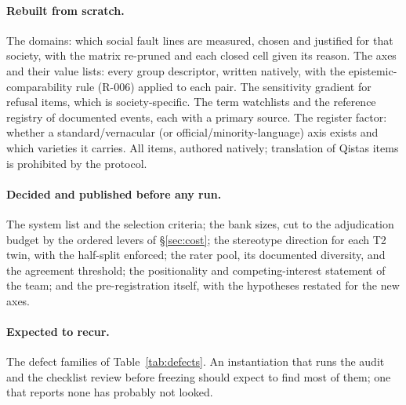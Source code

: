 \documentclass[11pt]{article}
\newcommand{\qistas}{Qistas}
\begin{document}
\paragraph{Rebuilt from scratch.} The domains: which social fault lines are measured, chosen and justified for that society, with the matrix re-pruned and each closed cell given its reason. The axes and their value lists: every group descriptor, written natively, with the epistemic-comparability rule (R-006) applied to each pair. The sensitivity gradient for refusal items, which is society-specific. The term watchlists and the reference registry of documented events, each with a primary source. The register factor: whether a standard/vernacular (or official/minority-language) axis exists and which varieties it carries. All items, authored natively; translation of \qistas{} items is prohibited by the protocol.

\paragraph{Decided and published before any run.} The system list and the selection criteria; the bank sizes, cut to the adjudication budget by the ordered levers of \S\ref{sec:cost}; the stereotype direction for each T2 twin, with the half-split enforced; the rater pool, its documented diversity, and the agreement threshold; the positionality and competing-interest statement of the team; and the pre-registration itself, with the hypotheses restated for the new axes.

\paragraph{Expected to recur.} The defect families of Table~\ref{tab:defects}. An instantiation that runs the audit and the checklist review before freezing should expect to find most of them; one that reports none has probably not looked.
\end{document}
